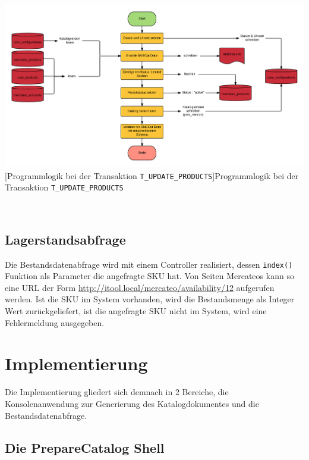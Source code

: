 	\begin{minipage}{\linewidth}
		\vspace{1em}
		\centering
		\includegraphics[width=1 \linewidth]{img/updateCatalogComplete}
		[Programmlogik  bei der Transaktion \texttt{T\_UPDATE\_PRODUCTS}]{Programmlogik  bei der Transaktion \texttt{T\_UPDATE\_PRODUCTS}}
		\vspace{1em}
	\end{minipage}\\
	
	\subsection{Lagerstandsabfrage}
	
	Die Bestandsdatenabfrage wird mit einem Controller realisiert, dessen \texttt{index()} Funktion als Parameter die angefragte SKU hat.
	Von Seiten Mercateos kann so eine URL der Form \url{http://itool.local/mercateo/availability/12} aufgerufen werden. Ist die SKU im System vorhanden, wird die Bestandsmenge als Integer Wert zurückgeliefert, ist die angefragte SKU nicht im System, wird eine Fehlermeldung ausgegeben.
	\clearpage
	\section{Implementierung}
	
	Die Implementierung gliedert sich demnach in 2 Bereiche, die Konsolenanwendung zur Generierung des Katalogdokumentes und die Bestandsdatenabfrage.
	
	\subsection{Die PrepareCatalog Shell}
	
